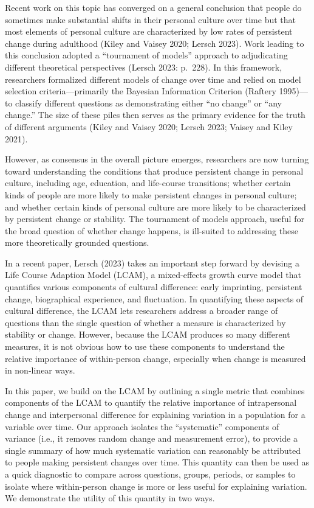 \documentclass[
  11pt,
]{article}
\begin{document}
Recent work on this topic has converged on a general conclusion that
people do sometimes make substantial shifts in their personal culture
over time but that most elements of personal culture are characterized
by low rates of persistent change during adulthood (Kiley and Vaisey
2020; Lersch 2023). Work leading to this conclusion adopted a
``tournament of models'' approach to adjudicating different theoretical
perspectives (Lersch 2023: p.~228). In this framework, researchers
formalized different models of change over time and relied on model
selection criteria---primarily the Bayesian Information Criterion
(Raftery 1995)---to classify different questions as demonstrating either
``no change'' or ``any change.'' The size of these piles then serves as
the primary evidence for the truth of different arguments (Kiley and
Vaisey 2020; Lersch 2023; Vaisey and Kiley 2021).

However, as consensus in the overall picture emerges, researchers are
now turning toward understanding the conditions that produce persistent
change in personal culture, including age, education, and life-course
transitions; whether certain kinds of people are more likely to make
persistent changes in personal culture; and whether certain kinds of
personal culture are more likely to be characterized by persistent
change or stability. The tournament of models approach, useful for the
broad question of whether change happens, is ill-suited to addressing
these more theoretically grounded questions.

In a recent paper, Lersch (2023) takes an important step forward by
devising a Life Course Adaption Model (LCAM), a mixed-effects growth
curve model that quantifies various components of cultural difference:
early imprinting, persistent change, biographical experience, and
fluctuation. In quantifying these aspects of cultural difference, the
LCAM lets researchers address a broader range of questions than the
single question of whether a measure is characterized by stability or
change. However, because the LCAM produces so many different measures,
it is not obvious how to use these components to understand the relative
importance of within-person change, especially when change is measured
in non-linear ways.

In this paper, we build on the LCAM by outlining a single metric that
combines components of the LCAM to quantify the relative importance of
intrapersonal change and interpersonal difference for explaining
variation in a population for a variable over time. Our approach
isolates the ``systematic'' components of variance (i.e., it removes
random change and measurement error), to provide a single summary of how
much systematic variation can reasonably be attributed to people making
persistent changes over time. This quantity can then be used as a quick
diagnostic to compare across questions, groups, periods, or samples to
isolate where within-person change is more or less useful for explaining
variation. We demonstrate the utility of this quantity in two ways.
\end{document}
